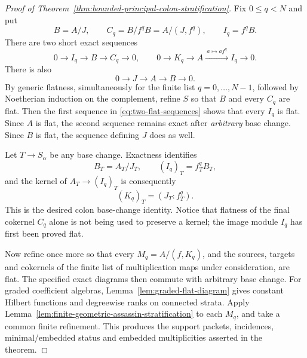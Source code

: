 \begin{proof}[Proof of Theorem~\ref{thm:bounded-principal-colon-stratification}]
Fix \(0\le q<N\) and put
\[
 B=A/J,\qquad C_q=B/f^qB=A/(J,f^q),\qquad
 I_q=f^qB.
\]
There are two short exact sequences
\begin{equation}\label{eq:two-flat-sequences}
 0\longrightarrow I_q\longrightarrow B\longrightarrow C_q
 \longrightarrow0,
 \qquad
 0\longrightarrow K_q\longrightarrow A
 \xrightarrow{\ a\mapsto af^q\ } I_q\longrightarrow0.
\end{equation}
There is also
\[
 0\longrightarrow J\longrightarrow A\longrightarrow B\longrightarrow0.
\]
By generic flatness, simultaneously for the finite list
\(q=0,\ldots,N-1\), followed by Noetherian induction on the
complement, refine \(S\) so that \(B\) and every \(C_q\) are flat.
Then the first sequence in \eqref{eq:two-flat-sequences} shows that
every \(I_q\) is flat.  Since \(A\) is flat, the second sequence
remains exact after \emph{arbitrary} base change.  Since \(B\) is
flat, the sequence defining \(J\) does as well.

Let \(T\to S_\alpha\) be any base change.  Exactness identifies
\[
 B_T=A_T/J_T,\qquad
 (I_q)_T=f_T^qB_T,
\]
and the kernel of \(A_T\to(I_q)_T\) is consequently
\[
 (K_q)_T=(J_T:f_T^q).
\]
This is the desired colon base-change identity.  Notice that flatness
of the final cokernel \(C_q\) alone is not being used to preserve a
kernel; the image module \(I_q\) has first been proved flat.

Now refine once more so that every
\(M_q=A/(f,K_q)\), and the sources, targets and cokernels of the
finite list of multiplication maps under consideration, are flat.
The specified exact diagrams then commute with arbitrary base change.
For graded coefficient algebras, Lemma~\ref{lem:graded-flat-diagram}
gives constant Hilbert functions and degreewise ranks on connected strata.  Apply
Lemma~\ref{lem:finite-geometric-assassin-stratification} to each
\(M_q\), and take a common finite refinement.  This produces the
support packets, incidences, minimal/embedded status and embedded
multiplicities asserted in the theorem.
\end{proof}

